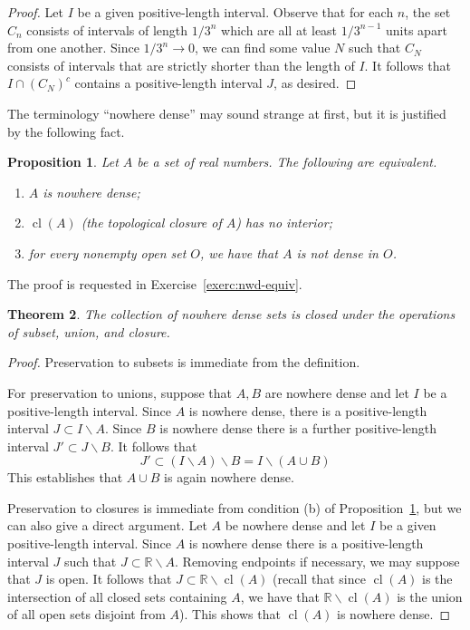 \documentclass[11pt,oneside]{amsbook}
\newcommand{\R}{\mathbb R}
\DeclareMathOperator{\cl}{cl}
\theoremstyle{definition}
\theoremstyle{plain}
\newtheorem{theorem}{Theorem}[section]
\newtheorem{proposition}[theorem]{Proposition}
\theoremstyle{definition}
\theoremstyle{remark}
\numberwithin{equation}{section}
\numberwithin{figure}{section}
\begin{document}
\begin{proof}
  Let $I$ be a given positive-length interval. Observe that for each $n$, the set $C_n$ consists of intervals of length $1/3^n$ which are all at least $1/3^{n-1}$ units apart from one another. Since $1/3^n\to0$, we can find some value $N$ such that $C_N$ consists of intervals that are strictly shorter than the length of $I$. It follows that $I\cap (C_N)^c$ contains a positive-length interval $J$, as desired.
\end{proof}

The terminology ``nowhere dense'' may sound strange at first, but it is justified by the following fact.

\begin{proposition}
  \label{prop:nwd-equiv}
  Let $A$ be a set of real numbers. The following are equivalent.
  \begin{enumerate}
    \item $A$ is nowhere dense;
    \item $\cl(A)$ (the topological closure of $A$) has no interior;
    \item for every nonempty open set $O$, we have that $A$ is not dense in $O$.
  \end{enumerate}
\end{proposition}

The proof is requested in Exercise~\ref{exerc:nwd-equiv}.

\begin{theorem}
  The collection of nowhere dense sets is closed under the operations of subset, union, and closure.
\end{theorem}

\begin{proof}
  Preservation to subsets is immediate from the definition.

  For preservation to unions, suppose that $A,B$ are nowhere dense and let $I$ be a positive-length interval. Since $A$ is nowhere dense, there is a positive-length interval $J\subset I\smallsetminus A$. Since $B$ is nowhere dense there is a further positive-length interval $J'\subset J\smallsetminus B$. It follows that
  \[J'\subset (I\smallsetminus A)\smallsetminus B=I\smallsetminus (A\cup B)
  \]
  This establishes that $A\cup B$ is again nowhere dense.

  Preservation to closures is immediate from condition (b) of Proposition~\ref{prop:nwd-equiv}, but we can also give a direct argument. Let $A$ be nowhere dense and let $I$ be a given positive-length interval. Since $A$ is nowhere dense there is a positive-length interval $J$ such that $J\subset\R\smallsetminus A$. Removing endpoints if necessary, we may suppose that $J$ is open. It follows that $J\subset\R\smallsetminus\cl(A)$ (recall that since $\cl(A)$ is the intersection of all closed sets containing $A$, we have that $\R\smallsetminus\cl(A)$ is the union of all open sets disjoint from $A$). This shows that $\cl(A)$ is nowhere dense.
\end{proof}
\end{document}
